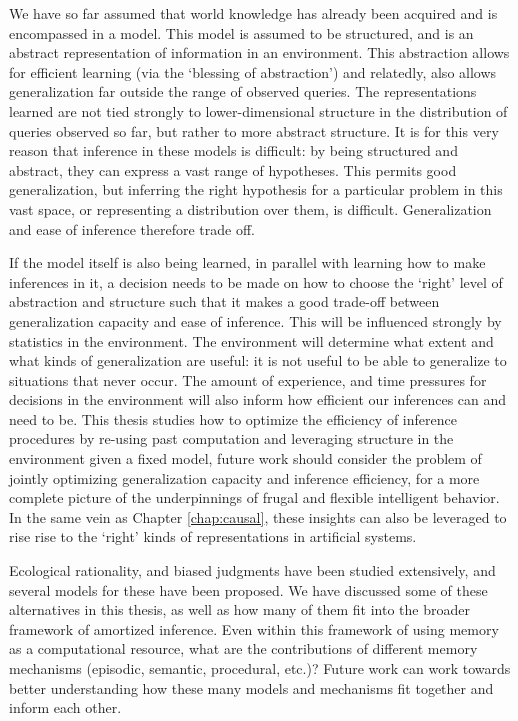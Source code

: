 We have so far assumed that world knowledge has already been acquired and is encompassed in a model. This model is assumed to be structured, and is an abstract representation of information in an environment. This abstraction allows for efficient learning (via the `blessing of abstraction'\cite{harlow1949formation, kemp2007learning, goodman1983fact}) and relatedly, also allows generalization far outside the range of observed queries. The representations learned are not tied strongly to lower-dimensional structure in the distribution of queries observed so far, but rather to more abstract structure. It is for this very reason that inference in these models is difficult: by being structured and abstract, they can express a vast range of hypotheses. This permits good generalization, but inferring the right hypothesis for a particular problem in this vast space, or representing a distribution over them, is difficult. Generalization and ease of inference therefore trade off. 

If the model itself is also being learned, in parallel with learning how to make inferences in it, a decision needs to be made on how to choose the `right' level of abstraction and structure such that it makes a good trade-off between generalization capacity and ease of inference. This will be influenced strongly by statistics in the environment. The environment will determine what extent and what kinds of generalization are useful: it is not useful to be able to generalize to situations that never occur. The amount of experience, and time pressures for decisions in the environment will also inform how efficient our inferences can and need to be. This thesis studies how to optimize the efficiency of inference procedures by re-using past computation and leveraging structure in the environment given a fixed model, future work should consider the problem of jointly optimizing generalization capacity and inference efficiency, for a more complete picture of the underpinnings of frugal and flexible intelligent behavior. In the same vein as Chapter \ref{chap:causal}, these insights can also be leveraged to rise rise to the `right' kinds of representations in artificial systems.

Ecological rationality, and biased judgments have been studied extensively, and several models for these have been proposed. We have discussed some of these alternatives in this thesis, as well as how many of them fit into the broader framework of amortized inference. Even within this framework of using memory as a computational resource,  what are the contributions of different memory mechanisms (episodic, semantic, procedural, etc.)? Future work can work towards better understanding how these many models and mechanisms fit together and inform each other.


